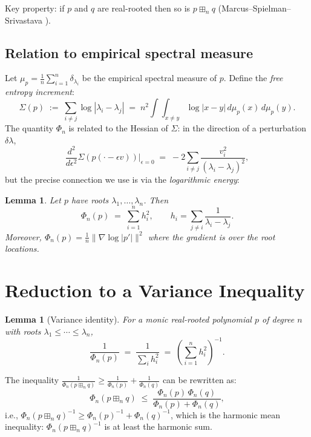 \documentclass[12pt]{article}
\newtheorem{lemma}[theorem]{Lemma}
\theoremstyle{definition}
\theoremstyle{remark}
\begin{document}
Key property: if $p$ and $q$ are real-rooted then so is $p\boxplus_n q$
(Marcus--Spielman--Srivastava \cite{MSS}).

\subsection{Relation to empirical spectral measure}

Let $\mu_p = \frac{1}{n}\sum_{i=1}^n\delta_{\lambda_i}$ be the empirical
spectral measure of $p$.  Define the \emph{free entropy increment}:
\[
  \Sigma(p) \;:=\; \sum_{i\neq j}\log|\lambda_i - \lambda_j|
  \;=\; n^2 \int\!\!\int_{x\neq y}\log|x-y|\,d\mu_p(x)\,d\mu_p(y).
\]
The quantity $\Phi_n$ is related to the Hessian of $\Sigma$: in the direction
of a perturbation $\delta\lambda$,
\[
  \frac{d^2}{d\epsilon^2}\Sigma(p(\cdot - \epsilon v))\Big|_{\epsilon=0}
  \;=\; -2\sum_{i\neq j}\frac{v_i^2}{(\lambda_i-\lambda_j)^2},
\]
but the precise connection we use is via the \emph{logarithmic energy}:

\begin{lemma}\label{lem:variance}
Let $p$ have roots $\lambda_1,\dots,\lambda_n$.  Then
\begin{equation}\label{eq:Phi-var}
  \Phi_n(p)
  \;=\;
  \sum_{i=1}^n h_i^2,
  \qquad
  h_i = \sum_{j\neq i}\frac{1}{\lambda_i-\lambda_j}.
\end{equation}
Moreover, $\Phi_n(p) = \frac{1}{n}\|\nabla\log|p'|\|^2$ where the gradient
is over the root locations.
\end{lemma}

\section{Reduction to a Variance Inequality}

\begin{lemma}[Variance identity]\label{lem:var-id}
For a monic real-rooted polynomial $p$ of degree $n$ with roots
$\lambda_1 \leq \cdots \leq \lambda_n$,
\begin{equation}\label{eq:var}
  \frac{1}{\Phi_n(p)}
  \;=\;
  \frac{1}{\sum_i h_i^2}
  \;=\;
  \left(\sum_{i=1}^n h_i^2\right)^{-1}.
\end{equation}
\end{lemma}

The inequality $\frac{1}{\Phi_n(p\boxplus_n q)}\ge\frac{1}{\Phi_n(p)}
+\frac{1}{\Phi_n(q)}$ can be rewritten as:
\begin{equation}\label{eq:ineq}
  \Phi_n(p\boxplus_n q) \;\le\; \frac{\Phi_n(p)\,\Phi_n(q)}{\Phi_n(p)+\Phi_n(q)},
\end{equation}
i.e., $\Phi_n(p\boxplus_n q)^{-1}\ge\Phi_n(p)^{-1}+\Phi_n(q)^{-1}$, which
is the harmonic mean inequality: $\Phi_n(p\boxplus_n q)^{-1}$ is at least the
harmonic sum.
\end{document}
